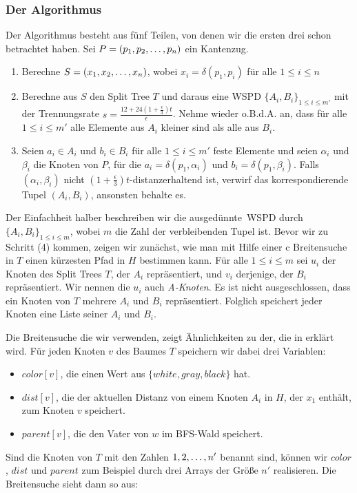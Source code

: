     \subsubsection*{Der Algorithmus}
    Der Algorithmus besteht aus fünf Teilen, von denen wir die ersten drei schon betrachtet haben.
    Sei $P = (p_1, p_2, \mathellipsis, p_n)$ ein Kantenzug.
    \begin{enumerate}
    	\item Berechne $S = (x_1, x_2, \mathellipsis, x_n)$, wobei $x_i = \delta(p_1, p_i)$ für alle $1 \leq i \leq n$
    	\item Berechne aus $S$ den Split Tree $T$ und daraus eine WSPD $\{A_i, B_i\}_{1 \leq i \leq m'}$ mit der Trennungsrate $s = \frac{12 + 24(1 + \frac{\epsilon}{3})t}{\epsilon}$. Nehme wieder o.B.d.A. an, dass für alle $1 \leq i \leq m'$ alle Elemente aus $A_i$ kleiner sind als alle aus $B_i$.
    	\item Seien $a_i \in A_i$ und $b_i \in B_i$ für alle $1 \leq i \leq m'$ feste Elemente und seien $\alpha_i$ und  $\beta_i$ die Knoten von $P$, für die $a_i = \delta(p_1, \alpha_i)$ und $b_i = \delta(p_1, \beta_i)$. Falls $(\alpha_i, \beta_i)$ nicht $(1+\frac{\epsilon}{3})t$-distanzerhaltend ist, verwirf das korrespondierende Tupel $(A_i, B_i)$, ansonsten behalte es.
    \end{enumerate}
    
    Der Einfachheit halber beschreiben wir die \glqq ausgedünnte\grqq\ WSPD durch $\{A_i, B_i\}_{1\leq i \leq m}$, wobei $m$ die Zahl der verbleibenden Tupel ist.
    Bevor wir zu Schritt (4) kommen, zeigen wir zunächst, wie man mit Hilfe einer c Breitensuche in $T$ einen kürzesten Pfad in $H$ bestimmen kann.  
    Für alle $1 \leq i \leq m$ sei $u_i$ der Knoten des Split Trees $T$, der $A_i$ repräsentiert, und $v_i$ derjenige, der $B_i$ repräsentiert. Wir nennen die $u_i$ auch \emph{A-Knoten}. Es ist nicht ausgeschlossen, dass ein Knoten von $T$ mehrere $A_i$ und $B_i$ repräsentiert. Folglich speichert jeder Knoten eine Liste seiner $A_i$ und $B_i$.
    
    Die Breitensuche die wir verwenden, zeigt Ähnlichkeiten zu der, die in \cite{hagerup} erklärt wird. Für jeden Knoten $v$ des Baumes $T$ speichern wir dabei drei Variablen:
    \begin{itemize}
    	\item $color[v]$, die einen Wert aus $\{white, gray, black\}$ hat.
    	\item $dist[v]$, die der aktuellen Distanz von einem Knoten $A_i$ in $H$, der $x_1$ enthält, zum Knoten $v$ speichert.
    	\item $parent[v]$, die den Vater von $w$ im BFS-Wald speichert.
    \end{itemize}
    Sind die Knoten von $T$ mit den Zahlen $1, 2,\mathellipsis, n'$ benannt sind, können wir $color$, $dist$ und $parent$ zum Beispiel durch drei Arrays der Größe $n'$ realisieren.
    Die Breitensuche sieht dann so aus:
    
